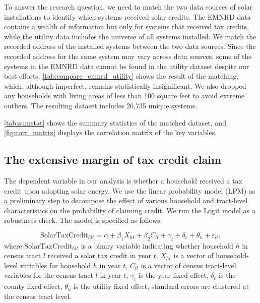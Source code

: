 \documentclass[11pt,twoside,letterpaper]{article}
\begin{document}
To answer the research question, we need to match the two data sources of solar installations to identify which systems received solar credits. The EMNRD data contains a wealth of information but only for systems that received tax credits, while the utility data includes the universe of all systems installed. We match the recorded address of the installed systems between the two data sources. Since the recorded address for the same system may vary across data sources, some of the systems in the EMNRD data cannot be found in the utility dataset despite our best efforts. \autoref{tab:compare_emnrd_utility} shows the result of the matching, which, although imperfect, remains statistically insignificant. We also dropped any households with living areas of less than 100 square feet to avoid extreme outliers. The resulting dataset includes 26,735 unique systems.


\autoref{tab:sumstat} shows the summary statistics of the matched dataset, and \autoref{fig:corr_matrix} displays the correlation matrix of the key variables.




\subsection{The extensive margin of tax credit claim}

The dependent variable in our analysis is whether a household received a tax credit upon adopting solar energy. We use the linear probability model (LPM) as a preliminary step to decompose the effect of various household and tract-level characteristics on the probability of claiming credit. We run the Logit model as a robustness check. The model is specified as follows:

\begin{equation}\label{reg_3}
    \text{SolarTaxCredit}_{hlt} = \alpha + \beta_1 X_{ht} + \beta_2 C_{lt}  + \gamma_t +  \delta_c + \theta_u + \varepsilon_{lt},
\end{equation}
where $\text{SolarTaxCredit}_{hlt}$ is a binary variable indicating whether household $h$ in census tract $l$ received a solar tax credit in year $t$, $X_{ht}$ is a vector of household-level variables for household $h$ in year $t$, $C_{lt}$ is a vector of census tract-level variables for the census tract $l$ in year $t$, $\gamma_t$ is the year fixed effect, $\delta_c$ is the county fixed effect, $\theta_u$ is the utility fixed effect, standard errors are clustered at the census tract level.
\end{document}

